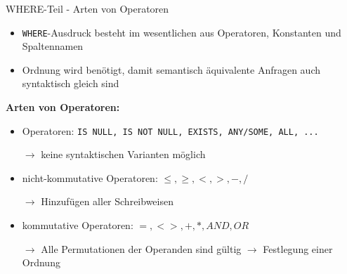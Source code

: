 \documentclass{beamer}
\begin{document}
\begin{frame}[fragile]{WHERE-Teil - Arten von Operatoren}
\begin{itemize}
\item \verb|WHERE|-Ausdruck besteht im wesentlichen aus Operatoren, Konstanten und Spaltennamen
\item Ordnung wird benötigt, damit semantisch äquivalente Anfragen auch syntaktisch gleich sind
\end{itemize}\pause
\textbf{Arten von Operatoren:}
\begin{itemize}
\item Operatoren: \verb|IS NULL, IS NOT NULL, EXISTS, ANY/SOME, ALL, ...|
\item[$\to$] keine syntaktischen Varianten möglich
\item nicht-kommutative Operatoren: $\leq,\geq,<,>,-,/$
\item[$\to$] Hinzufügen aller Schreibweisen
\item kommutative Operatoren: $=,<>,+,*,AND,OR$
\item[$\to$] Alle Permutationen der Operanden sind gültig $\to$ Festlegung einer Ordnung
\end{itemize}

\end{frame}



\end{document}

